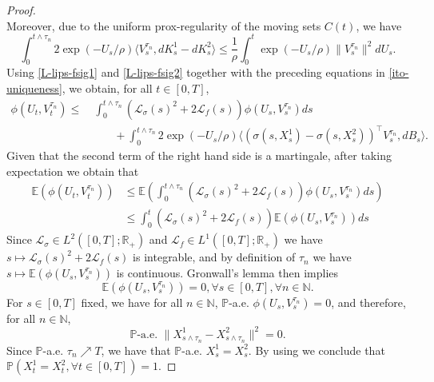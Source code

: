 \documentclass[preprint,12pt]{elsarticle}
\newcommand{\R}{\mathbb{R}}
\newcommand{\N}{\mathbb{N}}
\theoremstyle{plain}
\theoremstyle{definition}
\theoremstyle{remark}
\begin{document}
\begin{proof}
\begin{equation*}
		\end{equation*}
		Moreover, due to the uniform prox-regularity of the moving sets $C(t)$, we have 
		\begin{equation*}
			\int_0^{t\wedge\tau_n} 2\exp(-U_s/\rho)\langle V_s^{\tau_n},dK_s^1-dK_s^2\rangle\leq \frac{1}{\rho}\int_{0}^t \exp(-U_s/\rho)\|V_s^{\tau_n}\|^2 dU_s.
		\end{equation*}
Using \eqref{L-lips-fsig1} and \eqref{L-lips-fsig2} together with the preceding equations in \eqref{ito-uniqueness}, we obtain, for all $t\in [0,T]$,
\begin{equation*}
			\begin{aligned}
				\phi(U_t,V_t^{\tau_n})\leq & \ \int_0^{t\wedge\tau_n} (\mathscr{L}_\sigma(s)^2+2\mathscr{L}_f(s))\phi(U_s,V_s^{\tau_n})ds\\
				&\quad\quad + \int_0^{t\wedge\tau_n}  2\exp(-U_s/\rho) \langle (\sigma(s,X_s^1)-\sigma(s,X_s^2))^\top V_s^{\tau_n},dB_s\rangle.
			\end{aligned}
		\end{equation*}
        Given that the second term of the right hand side is a martingale, after taking expectation we obtain that 
        \begin{equation}\label{eqn-expect-before-gronwall}
            \begin{aligned}
            \mathbb{E}(\phi(U_t,V_t^{\tau_n}))&\leq   \mathbb{E}\left(\int_0^{t\wedge\tau_n} (\mathscr{L}_\sigma(s)^2+2\mathscr{L}_f(s))\phi(U_s,V_s^{\tau_n})ds\right)\\
            &\leq \int_0^t (\mathscr{L}_\sigma(s)^2+2\mathscr{L}_f(s))\mathbb{E}(\phi(U_s,V_s^{\tau_n}))ds
            \end{aligned}
        \end{equation}
Since $\mathscr{L}_\sigma\in L^2([0,T];\R_+)$ and $\mathscr{L}_f\in L^1([0,T];\R_+)$ we have $s\mapsto \mathscr{L}_\sigma(s)^2+2\mathscr{L}_f(s)$ is integrable, and by definition of $\tau_n$ we have $s\mapsto \mathbb{E}(\phi(U_s,V_s^{\tau_n}))$ is continuous. Gronwall's lemma then implies 
\begin{equation*}
    \mathbb{E}\left( \phi(U_s,V_s^{\tau_n})\right) = 0, \forall s\in [0,T], \forall n\in \N.
\end{equation*}
For $s\in [0,T]$ fixed, we have for all $n\in \N$, $\mathbb{P}$-a.e. $\phi(U_s,V_s^{\tau_n})= 0$, and therefore, for all $n\in \mathbb{N}$,
\begin{equation*}
		      \mathbb{P}\text{-a.e. } \|X_{s\wedge\tau_n}^1-X_{s\wedge\tau_n}^2\|^2 = 0.
		  \end{equation*}
          Since $\mathbb{P}$-a.e. $\tau_n\nearrow T$, we have that $\mathbb{P}$-a.e. $X_s^1 = X_s^2$. By using \cite[Problem 1.1.5]{MR1121940} we conclude that $\mathbb{P}(X^1_t = X^2_t, \forall t\in [0,T]) = 1$.
	\end{proof}
\end{document}
